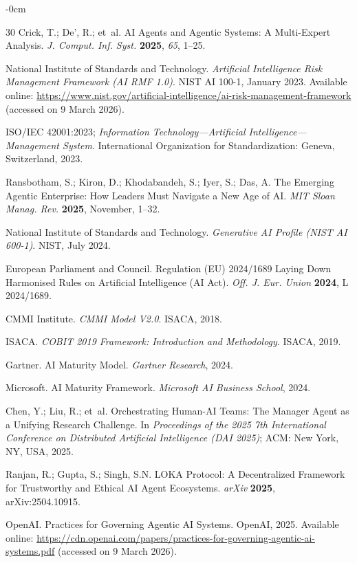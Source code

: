 \documentclass[ai,article,submit,pdftex,moreauthors]{Definitions/mdpi}
\begin{document}
\begin{adjustwidth}{-\extralength}{0cm}
\begin{thebibliography}{30}
Crick, T.; De', R.; et~al.
AI Agents and Agentic Systems: A Multi-Expert Analysis.
\textit{J. Comput. Inf. Syst.} \textbf{2025}, \textit{65}, 1--25.

National Institute of Standards and Technology.
\textit{Artificial Intelligence Risk Management Framework (AI RMF 1.0)}.
NIST AI 100-1, January 2023.
Available online: \url{https://www.nist.gov/artificial-intelligence/ai-risk-management-framework} (accessed on 9 March 2026).

ISO/IEC 42001:2023; \textit{Information Technology---Artificial Intelligence---Management System}.
International Organization for Standardization: Geneva, Switzerland, 2023.

Ransbotham, S.; Kiron, D.; Khodabandeh, S.; Iyer, S.; Das, A.
The Emerging Agentic Enterprise: How Leaders Must Navigate a New Age of AI.
\textit{MIT Sloan Manag. Rev.} \textbf{2025}, November, 1--32.

National Institute of Standards and Technology.
\textit{Generative AI Profile (NIST AI 600-1)}.
NIST, July 2024.

European Parliament and Council.
Regulation (EU) 2024/1689 Laying Down Harmonised Rules on Artificial Intelligence (AI Act).
\textit{Off. J. Eur. Union} \textbf{2024}, L 2024/1689.

CMMI Institute.
\textit{CMMI Model V2.0}.
ISACA, 2018.

ISACA.
\textit{COBIT 2019 Framework: Introduction and Methodology}.
ISACA, 2019.

Gartner.
AI Maturity Model.
\textit{Gartner Research}, 2024.

Microsoft.
AI Maturity Framework.
\textit{Microsoft AI Business School}, 2024.

Chen, Y.; Liu, R.; et~al.
Orchestrating Human-AI Teams: The Manager Agent as a Unifying Research Challenge.
In \textit{Proceedings of the 2025 7th International Conference on Distributed Artificial Intelligence (DAI 2025)};
ACM: New York, NY, USA, 2025.

Ranjan, R.; Gupta, S.; Singh, S.N.
LOKA Protocol: A Decentralized Framework for Trustworthy and Ethical AI Agent Ecosystems.
\textit{arXiv} \textbf{2025}, arXiv:2504.10915.

OpenAI.
Practices for Governing Agentic AI Systems.
OpenAI, 2025.
Available online: \url{https://cdn.openai.com/papers/practices-for-governing-agentic-ai-systems.pdf} (accessed on 9 March 2026).

\end{thebibliography}
\end{adjustwidth}
\end{document}
